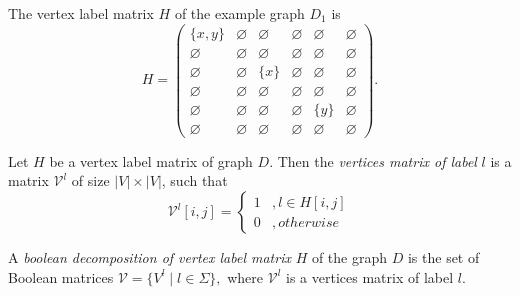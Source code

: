 The vertex label matrix $H$ of the example graph $D_1$ is
{
    \renewcommand{\arraystretch}{0.7}
    \setlength\arraycolsep{2pt}
$$
    H =
    \begin{pmatrix}
    \{x, y\}        & \varnothing     &   \varnothing      &   \varnothing   &   \varnothing   &    \varnothing  \\
    \varnothing     &   \varnothing   & \varnothing        &   \varnothing   & \varnothing     & \varnothing     \\
    \varnothing     &   \varnothing   &   \{x\}            &   \varnothing   & \varnothing     &   \varnothing   \\
    \varnothing     &   \varnothing   & \varnothing        &   \varnothing   &   \varnothing   &   \varnothing   \\
    \varnothing     &   \varnothing   &   \varnothing      &    \varnothing  &   \{y\}         & \varnothing     \\
    \varnothing     & \varnothing     &   \varnothing      &   \varnothing   & \varnothing     &   \varnothing
    \end{pmatrix}.
$$
}

\begin{definition}
Let $H$ be a vertex label matrix of graph $D$. Then the \emph{vertices matrix of label} $l$ is a matrix $\mathcal{V}^l$ of size $|V|\times|V|$, such that
\begin{equation*}
\mathcal{V}^l[i,j] =
  \begin{cases}
    1  &, l \in H[i, j] \\
    0  &, otherwise
  \end{cases}
\end{equation*}
\end{definition}

\begin{definition}
A \emph{boolean decomposition of vertex label matrix} $H$ of the graph $D$ is the set of Boolean matrices
$\mathcal{V} = \{V^l \mid l \in \Sigma\},$
where $\mathcal{V}^l$ is a vertices matrix of label $l$.
\end{definition}

